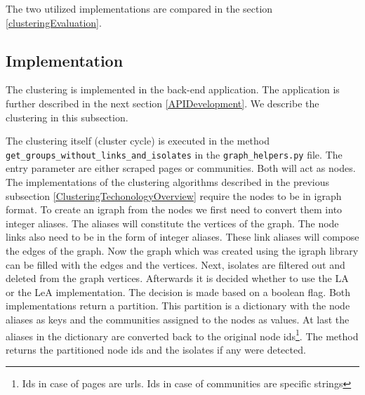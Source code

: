 The two utilized implementations are compared in the section \ref{clusteringEvaluation}.

\subsection{Implementation} \label{ClusteringImplementation}
The clustering is implemented in the back-end application. The application is further described in the next section \ref{APIDevelopment}. We describe the clustering in this subsection. 

The clustering itself (cluster cycle) is executed in the method \\ \texttt{get\_groups\_without\_links\_and\_isolates} in the \texttt{graph\_helpers.py} file. The entry parameter are either scraped pages or communities. Both will act as nodes. The implementations of the clustering algorithms described in the previous subsection \ref{ClusteringTechonologyOverview} require the nodes to be in igraph format. To create an igraph from the nodes we first need to convert them into integer aliases. The aliases will constitute the vertices of the graph. The node links also need to be in the form of integer aliases. These link aliases will compose the edges of the graph. Now the graph which was created using the igraph library can be filled with the edges and the vertices. Next, isolates are filtered out and deleted from the graph vertices. Afterwards it is decided whether to use the LA or the LeA implementation. The decision is made based on a boolean flag. Both implementations return a partition. This partition is a dictionary with the node aliases as keys and the communities assigned to the nodes as values. At last the aliases in the dictionary are converted back to the original node ids\footnote{Ids in case of pages are urls. Ids in case of communities are specific strings}. The method returns the partitioned node ids and the isolates if any were detected. 

